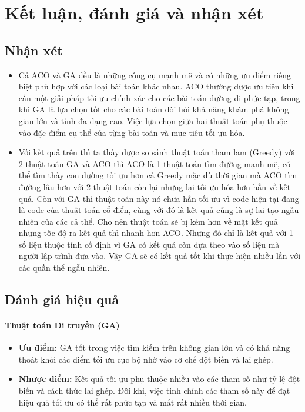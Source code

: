 \documentclass[14pt]{article}
\begin{document}
	\newpage
	\section{ Kết luận, đánh giá và nhận xét}
	
	\subsection{Nhận xét}
	\begin{itemize}
		\item Cả ACO và GA đều là những công cụ mạnh mẽ và có những ưu điểm riêng biệt phù hợp với các loại bài toán khác nhau. ACO thường được ưu tiên khi cần một giải pháp tối ưu chính xác cho các bài toán đường đi phức tạp, trong khi GA là lựa chọn tốt cho các bài toán đòi hỏi khả năng khám phá không gian lớn và tính đa dạng cao. Việc lựa chọn giữa hai thuật toán phụ thuộc vào đặc điểm cụ thể của từng bài toán và mục tiêu tối ưu hóa.
		\item Với kết quả trên thì ta thấy được so sánh thuật toán tham lam (Greedy) với 2 thuật toán GA và ACO thì ACO là 1 thuật toán tìm đường mạnh mẽ, có thể tìm thấy con đường tối ưu hơn cả Greedy mặc dù thời gian mà ACO tìm đường lâu hơn với 2 thuật toán còn lại nhưng lại tối ưu hóa hơn hẳn về kết quả. Còn với GA thì thuật toán này nó chưa hẳn tối ưu vì code hiện tại đang là code của thuật toán cổ điển, cùng với đó là kết quả cũng là sự lai tạo ngẫu nhiên của các cả thể. Cho nên thuật toán sẽ bị kém hơn về mặt kết quả nhưng tốc độ ra kết quả thì nhanh hơn ACO. Nhưng đó chỉ là kết quả với 1 số liệu thuộc tính cố định vì GA có kết quả còn dựa theo vào số liệu mà người lập trình đưa vào. Vậy GA sẽ có kết quả tốt khi thực hiện nhiều lần với các quần thể ngẫu nhiên.
	\end{itemize}
	\newpage
	\subsection{Đánh giá hiệu quả}
	\paragraph{Thuật toán Di truyền (GA)}
	\begin{itemize}
	 	\item \textbf{Ưu điểm:} GA tốt trong việc tìm kiếm trên không gian lớn và có khả năng thoát khỏi các điểm tối ưu cục bộ nhờ vào cơ chế đột biến và lai ghép.
	 	\item \textbf{Nhược điểm:} Kết quả tối ưu phụ thuộc nhiều vào các tham số như tỷ lệ đột biến và cách thức lai ghép. Đôi khi, việc tinh chỉnh các tham số này để đạt hiệu quả tối ưu có thể rất phức tạp và mất rất nhiều thời gian.
	\end{itemize}
	
\end{document}
